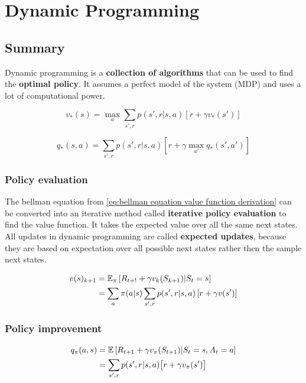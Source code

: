 \chapter{Dynamic Programming}
\section{Summary}
Dynamic programming is a \textbf{collection of algorithms} that can be used to find the \textbf{optimal policy}. It assumes a perfect model of the system (MDP) and uses a lot of computational power. 

\begin{equation}
v_*(s) = \max_a \sum_{s',r} p(s', r | s, a)[r + \gamma v_*(s')]
\label{eq:bellman optimality equation state-value function}
\end{equation}

\begin{equation}
q_*(s, a) = \sum_{s', r} p(s', r | s, a) [r + \gamma \max_{a'} q_*(s', a')]
\label{eq:bellman optimality equation action-value function}
\end{equation}

\subsection{Policy evaluation}
The bellman equation from \ref{eq:bellman equation value function derivation} can be converted into an iterative method called \textbf{iterative policy evaluation} to find the value function. It takes the expected value over all the same next states. All updates in dynamic programming are called \textbf{expected updates}, because they are based on expectation over all possible next states rather then the sample next states.

\begin{equation}
\begin{split}
v(s)_{k+1} 
& = \operatorname{\mathbb{E}}_\pi\left[ R_{t+!} + \gamma v_k(S_{k+1}) | S_t = s \right] \\
& = \sum_a \pi(a | s) \sum_{s', r} p(s', r | s, a) \left[r + \gamma v(s')\right] \\
\end{split}
\label{eq:iterative policy evaluation update rule}
\end{equation}

\subsection{Policy improvement}
\begin{equation}
\begin{split}
q_\pi(a, s) & = \operatorname{\mathbb{E}}\left[R_{t+1} + \gamma v_\pi(S_{t+1}) | S_t = s, A_t = a \right]\\
& = \sum_{s', r} p(s', r | s, a)\big[r + \gamma v_\pi(s')\big]
\end{split}
\label{eq:policy improvement, select the next action}
\end{equation}

